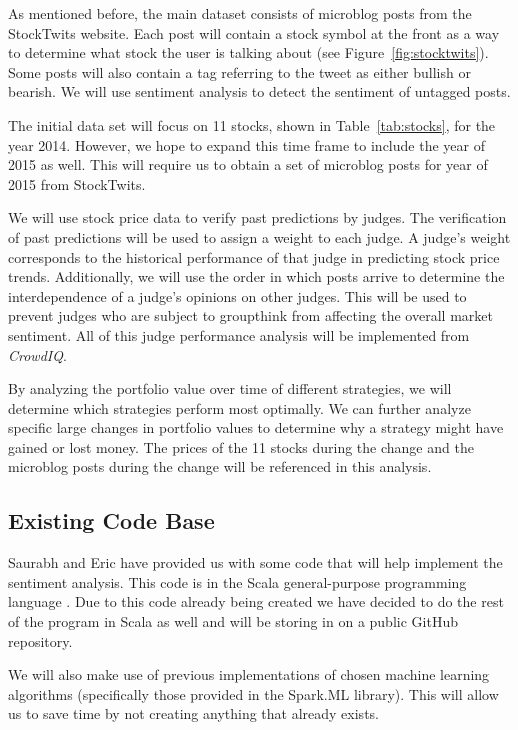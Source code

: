 As mentioned before, the main dataset consists of microblog posts from the StockTwits website. Each post will contain a stock symbol at the front as a way to determine what stock the user is talking about (see Figure~\ref{fig:stocktwits}). Some posts will also contain a tag referring to the tweet as either bullish or bearish. We will use sentiment analysis to detect the sentiment of untagged posts.

The initial data set will focus on 11 stocks, shown in Table~\ref{tab:stocks}, for the year 2014. However, we hope to expand this time frame to include the year of 2015 as well. This will require us to obtain a set of microblog posts for year of 2015 from StockTwits.

We will use stock price data to verify past predictions by judges. The verification of past predictions will be used to assign a weight to each judge. A judge's weight corresponds to the historical performance of that judge in predicting stock price trends. Additionally, we will use the order in which posts arrive to determine the interdependence of a judge's opinions on other judges. This will be used to prevent judges who are subject to groupthink from affecting the overall market sentiment. All of this judge performance analysis will be implemented from \textit{CrowdIQ}.

By analyzing the portfolio value over time of different strategies, we will determine which strategies perform most optimally. We can further analyze specific large changes in portfolio values to determine why a strategy might have gained or lost money. The prices of the 11 stocks during the change and the microblog posts during the change will be referenced in this analysis.

\subsection{Existing Code Base}

Saurabh and Eric have provided us with some code that will help implement the sentiment analysis. This code is in the Scala general-purpose programming language \cite{scala}. Due to this code already being created we have decided to do the rest of the program in Scala as well and will be storing in on a public GitHub repository.

We will also make use of previous implementations of chosen machine learning algorithms (specifically those provided in the Spark.ML library). This will allow us to save time by not creating anything that already exists.

